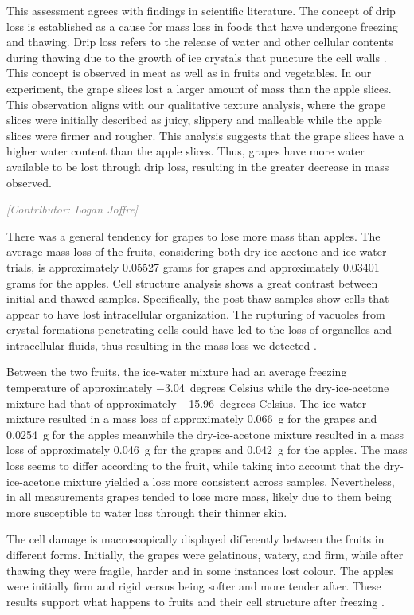 \documentclass[12pt, a4paper]{article}
\newcommand{\contributor}[1]{\vspace{4pt}\noindent\textcolor{gray}{\small\textit{[Contributor: #1]}}\vspace{2pt}}
\begin{document}
This assessment agrees with findings in scientific literature. The
concept of drip loss is established as a cause for mass loss in foods
that have undergone freezing and thawing. Drip loss refers to the
release of water and other cellular contents during thawing due to the
growth of ice crystals that puncture the cell walls \cite{lorv2014}.
This concept is observed in meat as well as in fruits and vegetables. In
our experiment, the grape slices lost a larger amount of mass than the
apple slices. This observation aligns with our qualitative texture
analysis, where the grape slices were initially described as juicy,
slippery and malleable while the apple slices were firmer and rougher.
This analysis suggests that the grape slices have a higher water content
than the apple slices. Thus, grapes have more water available to be
lost through drip loss, resulting in the greater decrease in mass
observed.

\contributor{Logan Joffre}

There was a general tendency for grapes to lose more mass than apples.
The average mass loss of the fruits, considering both dry-ice-acetone
and ice-water trials, is approximately 0.05527 grams for grapes and
approximately 0.03401 grams for the apples. Cell structure analysis
shows a great contrast between initial and thawed samples. Specifically,
the post thaw samples show cells that appear to have lost intracellular
organization. The rupturing of vacuoles from crystal formations
penetrating cells could have led to the loss of organelles and
intracellular fluids, thus resulting in the mass loss we detected
\cite{lorv2014}.

Between the two fruits, the ice-water mixture had an average freezing
temperature of approximately $-$3.04~degrees Celsius while the
dry-ice-acetone mixture had that of approximately $-$15.96~degrees
Celsius. The ice-water mixture resulted in a mass loss of approximately
0.066~g for the grapes and 0.0254~g for the apples meanwhile the
dry-ice-acetone mixture resulted in a mass loss of approximately 0.046~g
for the grapes and 0.042~g for the apples. The mass loss seems to differ
according to the fruit, while taking into account that the
dry-ice-acetone mixture yielded a loss more consistent across samples.
Nevertheless, in all measurements grapes tended to lose more mass,
likely due to them being more susceptible to water loss through their
thinner skin.

The cell damage is macroscopically displayed differently between the
fruits in different forms. Initially, the grapes were gelatinous, watery,
and firm, while after thawing they were fragile, harder and in some
instances lost colour. The apples were initially firm and rigid versus
being softer and more tender after. These results support what happens
to fruits and their cell structure after freezing \cite{willenberg2021}.
\end{document}
